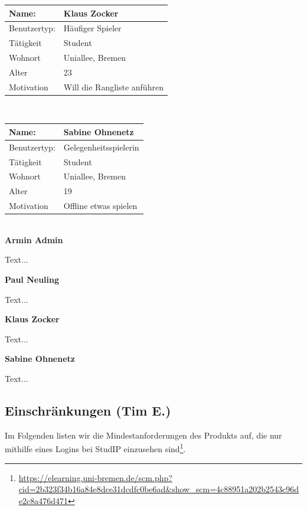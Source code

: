 \documentclass[fontsize=12pt,paper=a4,twoside]{scrartcl}
\begin{document}
    	\begin{tabular}{|p{}|p{}|}\hline
        \textbf{Name:} &  \textbf{Klaus Zocker}\\\hline
       Benutzertyp: & Häufiger Spieler \\\hline
       Tätigkeit	& Student\\\hline
       Wohnort & Uniallee, Bremen\\\hline
       Alter	 & 23\\\hline
       Motivation & Will die Rangliste anführen\\\hline
    \end{tabular}\\
    
    \begin{tabular}{|p{}|p{}|}\hline
        \textbf{Name:} &  \textbf{Sabine Ohnenetz}\\\hline
       Benutzertyp: & Gelegenheitsspielerin \\\hline
       Tätigkeit	& Student\\\hline
       Wohnort & Uniallee, Bremen\\\hline
       Alter	 & 19\\\hline
       Motivation & Offline etwas spielen \\\hline
    \end{tabular}\\
    
    \textbf{Armin Admin}
    
    Text...
    
    \textbf{Paul Neuling}
    
    Text...
    
    \textbf{Klaus Zocker}
    
    Text...
    
    \textbf{Sabine Ohnenetz}
    
    Text...
  
  \subsection{Einschränkungen (Tim E.)}

Im Folgenden listen wir die Mindestanforderungen des Produkts auf, die nur mithilfe eines Logins bei StudIP einzusehen sind\footnote{\url{https://elearning.uni-bremen.de/scm.php?cid=2b323f34b16a84e8dce31dcdfc0be6ad\&show\_scm=4c88951a202b2543c96de2c8a476d471}}.
\end{document}
